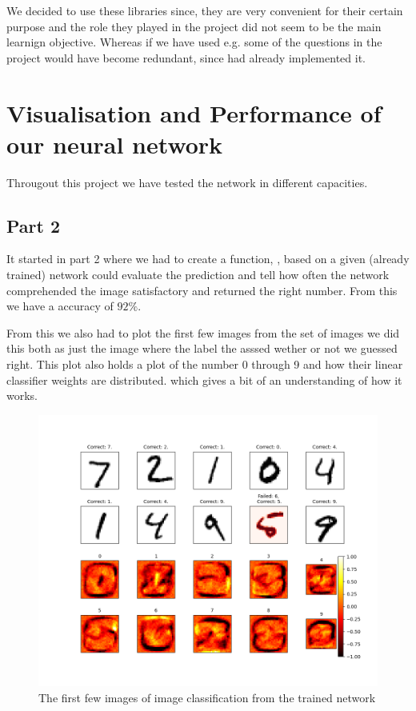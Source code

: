 \documentclass[a4paper,oneside,article,english]{memoir}
\begin{document}
We decided to use these libraries since, they are very convenient for their certain purpose and the role they played in the project did not seem to be the main learnign objective. Whereas if we have used e.g.  some of the questions in the project would have become redundant, since  had already implemented it.



\section{Visualisation and Performance of our neural network}  
\label{ch:visualisation}
Througout this project we have tested the network in different capacities. 
\subsection{Part 2}
It started in part 2 where we had to create a function, , based on a given (already trained) network could evaluate the prediction and tell how often the network comprehended the image satisfactory and returned the right number. From this we have a accuracy of $92\%$. 

From this we also had to plot the first few images from the set of images we did this both as just the image where the label the asssed wether or not we guessed right. This plot also holds a plot of the number 0 through 9 and how their linear classifier weights are distributed. which gives a bit of an understanding of how it works.

\begin{figure}[H]
    \centering
    \includegraphics[scale = 0.5]{plot_image_eval.png}
    \caption{The first few images of image classification from the trained network}
    \label{fig:evaluation}
\end{figure}
\end{document}
